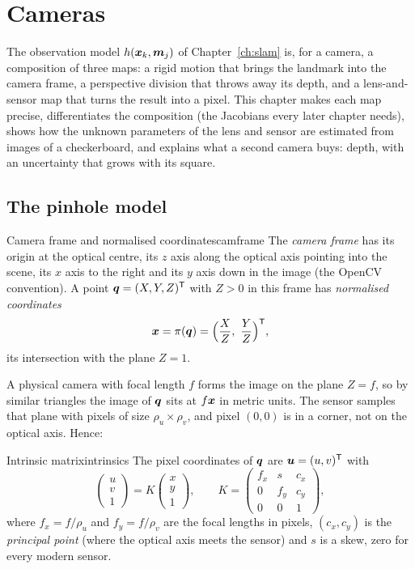 \chapter{Cameras}
\label{ch:cameras}

The observation model $h(\bm{x}_k,\bm{m}_j)$ of Chapter~\ref{ch:slam} is, for a
camera, a composition of three maps: a rigid motion that brings the
landmark into the camera frame, a perspective division that throws away
its depth, and a lens-and-sensor map that turns the result into a pixel.
This chapter makes each map precise, differentiates the composition (the
Jacobians every later chapter needs), shows how the unknown parameters of
the lens and sensor are estimated from images of a checkerboard, and
explains what a second camera buys: depth, with an uncertainty that grows
with its square.

\section{The pinhole model}

\begin{definition}{Camera frame and normalised coordinates}{camframe}
The \emph{camera frame} has its origin at the optical centre, its $z$
axis along the optical axis pointing into the scene, its $x$ axis to the
right and its $y$ axis down in the image (the OpenCV convention). A point
$\bm{q}=(X,Y,Z)^{\mathsf{T}}$ with $Z>0$ in this frame has \emph{normalised
coordinates}
\[
\vect{x}=\pi(\vect{q})=\Bigl(\frac{X}{Z},\ \frac{Y}{Z}\Bigr)\T,
\]
its intersection with the plane $Z=1$.
\end{definition}

A physical camera with focal length $f$ forms the image on the plane
$Z=f$, so by similar triangles the image of $\bm{q}$ sits at
$f\bm{x}$ in metric units. The sensor samples that plane with pixels of
size $\rho_u\times\rho_v$, and pixel $(0,0)$ is in a corner, not on the
optical axis. Hence:

\begin{definition}{Intrinsic matrix}{intrinsics}
The pixel coordinates of $\bm{q}$ are $\bm{u}=(u,v)^{\mathsf{T}}$ with
\[
\begin{pmatrix}u\\v\\1\end{pmatrix}=K\begin{pmatrix}x\\y\\1
\end{pmatrix},\qquad
K=\begin{pmatrix}f_x&s&c_x\\0&f_y&c_y\\0&0&1\end{pmatrix},
\]
where $f_x=f/\rho_u$ and $f_y=f/\rho_v$ are the focal lengths in pixels,
$(c_x,c_y)$ is the \emph{principal point} (where the optical axis meets
the sensor) and $s$ is a skew, zero for every modern sensor.
\end{definition}

